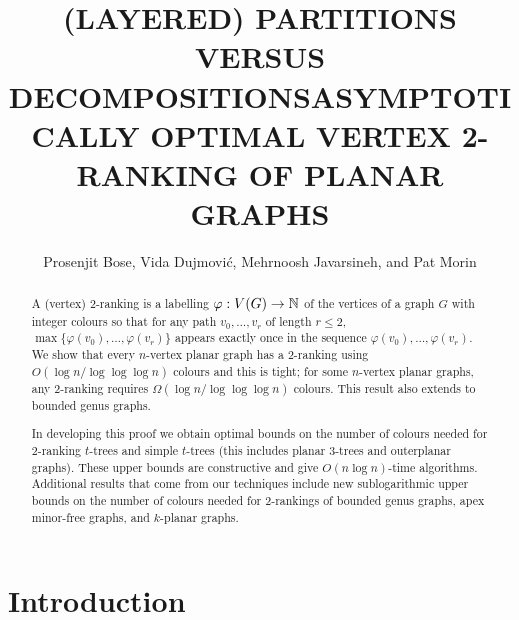 \documentclass[kpfonts]{patmorin}
\title{\MakeUppercase{(Layered) Partitions versus Decompositions}}
\author{}
\title{\MakeUppercase{Asymptotically Optimal Vertex 2-Ranking of Planar Graphs}}
\author{Prosenjit Bose, Vida Dujmović, Mehrnoosh Javarsineh, and Pat Morin}
\theoremstyle{named}
\begin{document}
\begin{titlepage}
\maketitle

\begin{abstract}
  A (vertex) 2-ranking is a labelling $\varphi:V(G)\to\mathbb{N}$ of the vertices of a graph $G$ with integer colours so that for any path $v_0,\ldots,v_r$ of length $r\le 2$, $\max\{\varphi(v_0),\ldots,\varphi(v_r)\}$ appears exactly once in the sequence $\varphi(v_0),\ldots,\varphi(v_r)$.  We show that every $n$-vertex planar graph has a 2-ranking using $O(\log n/\log\log\log n)$ colours and this is tight; for some $n$-vertex planar graphs, any 2-ranking requires $\Omega(\log n/\log\log\log n)$ colours.  This result also extends to bounded genus graphs.

  In developing this proof we obtain optimal bounds on the number of colours needed for 2-ranking $t$-trees and simple $t$-trees (this includes planar 3-trees and outerplanar graphs).  These upper bounds are constructive and give $O(n\log n)$-time algorithms.  Additional results that come from our techniques include new sublogarithmic upper bounds on the number of colours needed for 2-rankings of bounded genus graphs, apex minor-free graphs, and $k$-planar graphs.
\end{abstract}
\end{titlepage}

\tableofcontents

\newpage
{}

\section{Introduction}
\end{document}
